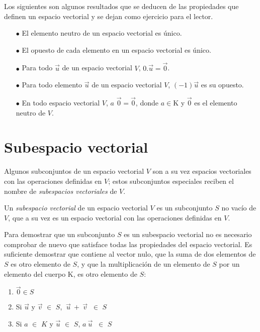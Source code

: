 \begin{remark}
Los siguientes son algunos resultados que se deducen de las propiedades que definen un espacio vectorial y se dejan como ejercicio para el lector.

\begin{itemize}
\item[$\bullet$]  El elemento neutro de un espacio vectorial es único. 

\item[$\bullet$]  El opuesto de cada elemento en un espacio vectorial es único. 

\item[$\bullet$]   Para todo $\vec{u}$ de un espacio vectorial $V$, $0.\vec{u}=\vec{0}$. 


\item[$\bullet$] Para todo elemento $\vec{u}$ de un espacio vectorial $V$, $(-1)\vec{u}$ es su opuesto.

\item[$\bullet$] En todo espacio vectorial $V$, $a$ $\vec{0}=\vec{0}$, donde $a\in $K y $\vec{0}$ es el elemento neutro de $V$.

\end{itemize}
\end{remark}


\section{Subespacio vectorial}
\label{Subespacio vectorial}
Algunos subconjuntos de un espacio vectorial $V$ son a su vez espacios vectoriales con las operaciones definidas en $V$; estos subconjuntos especiales reciben el nombre de \textit{subespacios vectoriales} de $V$.

\bigskip

\begin{definition}
Un \textit{subespacio vectorial} de un espacio vectorial $V$ es un subconjunto $S$ no vacío  de $V$, que a su vez es un espacio vectorial con las operaciones definidas en $V$.
\end{definition}


\bigskip

\begin{remark}
Para demostrar que un subconjunto  $S$ es un subespacio vectorial no es necesario comprobar de nuevo que satisface todas las propiedades del espacio vectorial. Es suficiente demostrar que  contiene al vector nulo, que la suma de dos elementos de $S$ es otro elemento de $S$, y que la multiplicación de un elemento de $S$ por un elemento del cuerpo K, es otro elemento de $S$:


\bigskip

 
\begin{enumerate}
\item  $\vec{0} \in S$
\item Si $\vec{u}$ y $\vec{v}$ $ \in$ $S$, $~\vec{u}~+  ~\vec{v}~$ $ \in$ $S$

\item Si $a$ $ \in$ $K$ y $\vec{u}$ $ \in$ $S$, $a~\vec{u}~$ $\in$ $S$

\end{enumerate}
\end{remark}


